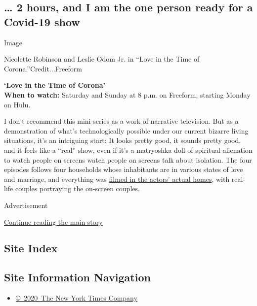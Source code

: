 \hypertarget{-2-hours-and-i-am-the-one-person-ready-for-a-covid-19-show}{%
\subsection{\ldots{} 2 hours, and I am the one person ready for a
Covid-19
show}\label{-2-hours-and-i-am-the-one-person-ready-for-a-covid-19-show}}

Image

Nicolette Robinson and Leslie Odom Jr. in ``Love in the Time of
Corona.''Credit...Freeform

\textbf{`Love in the Time of Corona'}\\
\textbf{When to watch:} Saturday and Sunday at 8 p.m. on Freeform;
starting Monday on Hulu.

I don't recommend this mini-series as a work of narrative television.
But as a demonstration of what's technologically possible under our
current bizarre living situations, it's an intriguing start: It looks
pretty good, it sounds pretty good, and it feels like a ``real'' show,
even if it's a matryoshka doll of spiritual alienation to watch people
on screens watch people on screens talk about isolation. The four
episodes follows four households whose inhabitants are in various states
of love and marriage, and everything was
\href{https://www.nytimes3xbfgragh.onion/2020/08/12/arts/television/coastal-elites-connecting-social-distance.html}{filmed
in the actors' actual homes}, with real-life couples portraying the
on-screen couples.

Advertisement

\protect\hyperlink{after-bottom}{Continue reading the main story}

\hypertarget{site-index}{%
\subsection{Site Index}\label{site-index}}

\hypertarget{site-information-navigation}{%
\subsection{Site Information
Navigation}\label{site-information-navigation}}

\begin{itemize}
\tightlist
\item
  \href{https://help.nytimes3xbfgragh.onion/hc/en-us/articles/115014792127-Copyright-notice}{©~2020~The
  New York Times Company}
\end{itemize}

